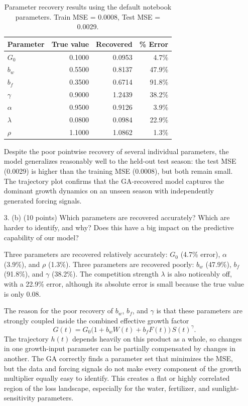 \documentclass{article}
\begin{document}
\begin{enumerate}
\begin{answer}
\begin{table}[H]
\centering
\caption{Parameter recovery results using the default notebook parameters. Train MSE = 0.0008, Test MSE = 0.0029.}
\begin{tabular}{lrrr}
\hline
\textbf{Parameter} & \textbf{True value} & \textbf{Recovered} & \textbf{\% Error} \\
\hline
$G_0$      & 0.1000 & 0.0953 &  4.7\% \\
$b_w$      & 0.5500 & 0.8137 & 47.9\% \\
$b_f$      & 0.3500 & 0.6714 & 91.8\% \\
$\gamma$   & 0.9000 & 1.2439 & 38.2\% \\
$\alpha$   & 0.9500 & 0.9126 &  3.9\% \\
$\lambda$  & 0.0800 & 0.0984 & 22.9\% \\
$\rho$     & 1.1000 & 1.0862 &  1.3\% \\
\hline
\end{tabular}
\label{tab:recovery}
\end{table}

Despite the poor pointwise recovery of several individual parameters, the model generalizes reasonably well to the held-out test season: the test MSE (0.0029) is higher than the training MSE (0.0008), but both remain small. The trajectory plot confirms that the GA-recovered model captures the dominant growth dynamics on an unseen season with independently generated forcing signals.
\end{answer}
\newpage
\item[3. (b)] (10 points) Which parameters are recovered accurately? Which are harder to identify, and why? Does this have a big impact on the predictive capability of our model?

\begin{answer}
Three parameters are recovered relatively accurately: $G_0$ (4.7\% error), $\alpha$ (3.9\%), and $\rho$ (1.3\%). Three parameters are recovered poorly: $b_w$ (47.9\%), $b_f$ (91.8\%), and $\gamma$ (38.2\%). The competition strength $\lambda$ is also noticeably off, with a 22.9\% error, although its absolute error is small because the true value is only 0.08.

The reason for the poor recovery of $b_w$, $b_f$, and $\gamma$ is that these parameters are strongly coupled inside the combined effective growth factor
\[
G(t) = G_0 \bigl(1 + b_w W(t) + b_f F(t)\bigr) \, S(t)^{\gamma}.
\]
The trajectory $h(t)$ depends heavily on this product as a whole, so changes in one growth-input parameter can be partially compensated by changes in another. The GA correctly finds a parameter set that minimizes the MSE, but the data and forcing signals do not make every component of the growth multiplier equally easy to identify. This creates a flat or highly correlated region of the loss landscape, especially for the water, fertilizer, and sunlight-sensitivity parameters.


\end{answer}
\end{enumerate}
\end{document}
